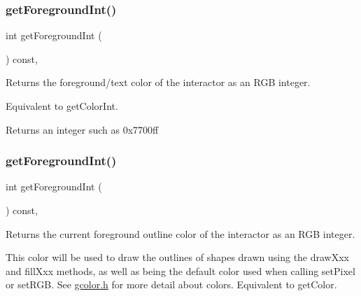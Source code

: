 \subsubsection{\texorpdfstring{get\+Foreground\+Int()}{getForegroundInt()}\hspace{0.1cm}{\footnotesize\ttfamily [1/2]}}
{\footnotesize\ttfamily int get\+Foreground\+Int (\begin{DoxyParamCaption}{ }\end{DoxyParamCaption}) const\hspace{0.3cm}{\ttfamily [virtual]}, {\ttfamily [inherited]}}



Returns the foreground/text color of the interactor as an R\+GB integer. 

Equivalent to get\+Color\+Int. \begin{DoxyReturn}{Returns}
an integer such as 0x7700ff 
\end{DoxyReturn}
\mbox{\label{classGDrawingSurface_ac3b12ab385a6ef9ae90fc879860ba726}} 
\subsubsection{\texorpdfstring{get\+Foreground\+Int()}{getForegroundInt()}\hspace{0.1cm}{\footnotesize\ttfamily [2/2]}}
{\footnotesize\ttfamily int get\+Foreground\+Int (\begin{DoxyParamCaption}{ }\end{DoxyParamCaption}) const\hspace{0.3cm}{\ttfamily [virtual]}, {\ttfamily [inherited]}}



Returns the current foreground outline color of the interactor as an R\+GB integer. 

This color will be used to draw the outlines of shapes drawn using the draw\+Xxx and fill\+Xxx methods, as well as being the default color used when calling set\+Pixel or set\+R\+GB. See \mbox{\hyperlink{gcolor_8h_source}{gcolor.\+h}} for more detail about colors. Equivalent to get\+Color. \mbox{\label{classGCanvas_ac307c120ba81c4531d46924ba3358382}} 
